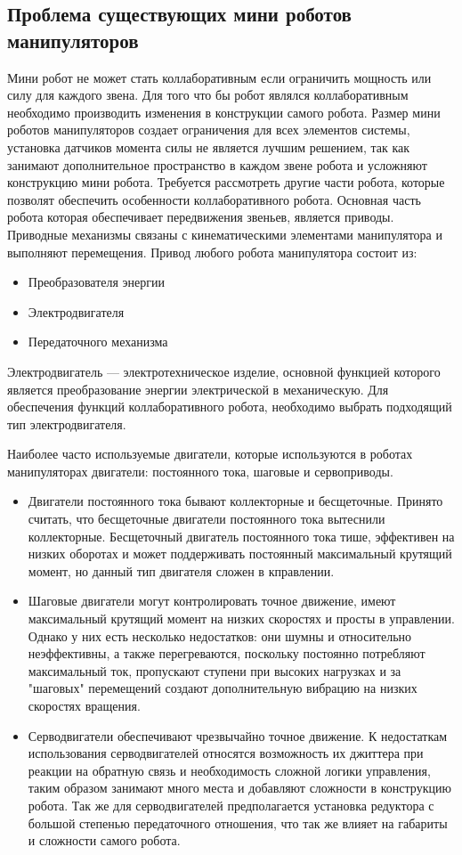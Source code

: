 \subsection{Проблема существующих мини роботов манипуляторов}
Мини робот не может стать коллаборативным если ограничить мощность или силу для каждого звена. Для того что бы робот являлся коллаборативным необходимо производить изменения в конструкции самого робота.
Размер мини роботов манипуляторов создает ограничения для всех элементов системы, установка датчиков момента силы не является лучшим решением, так как занимают дополнительное пространство в каждом звене робота и усложняют конструкцию мини робота. Требуется рассмотреть другие части робота, которые позволят обеспечить особенности коллаборативного робота. Основная часть робота которая обеспечивает передвижения звеньев, является приводы. Приводные механизмы связаны с кинематическими элементами манипулятора и выполняют перемещения.
Привод любого робота манипулятора состоит из:
\begin{itemize}
	\item Преобразователя энергии
	\item Электродвигателя
	\item Передаточного механизма
\end{itemize}

Электродвигатель —  электротехническое изделие, основной функцией которого является преобразование энергии электрической в механическую. Для обеспечения функций коллаборативного робота, необходимо выбрать подходящий тип электродвигателя.

Наиболее часто используемые двигатели, которые используются в роботах манипуляторах двигатели: постоянного тока, шаговые и сервоприводы.
\begin{itemize}
	\item Двигатели постоянного тока бывают коллекторные и бесщеточные. Принято считать, что бесщеточные двигатели постоянного тока вытеснили коллекторные. Бесщеточный двигатель постоянного тока тише, эффективен на низких оборотах и может поддерживать постоянный максимальный крутящий момент, но данный тип двигателя сложен в кправлении.
	\item Шаговые двигатели могут контролировать точное движение, имеют максимальный крутящий момент на низких скоростях и просты в управлении. Однако у них есть несколько недостатков: они шумны и относительно неэффективны, а также перегреваются, поскольку постоянно потребляют максимальный ток, пропускают ступени при высоких нагрузках и за "шаговых" перемещений создают дополнительную вибрацию на низких скоростях вращения.
	\item Серводвигатели обеспечивают чрезвычайно точное движение. К недостаткам использования серводвигателей относятся возможность их джиттера при реакции на обратную связь и необходимость сложной логики управления, таким образом занимают много места и добавляют сложности в конструкцию робота. Так же для серводвигателей предполагается установка редуктора с большой степенью передаточного отношения, что так же влияет на габариты и сложности самого робота.
\end{itemize}


